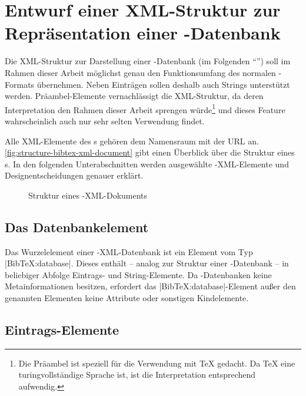 \section[Entwurf einer XML-Struktur]{Entwurf einer XML-Struktur zur Repräsentation einer \mbox{\BibTeX-}Datenbank}

\def\temp{
    Die Präambel ist speziell für die Verwendung mit \TeX{} gedacht. Da \TeX{}
    eine turingvollständige Sprache ist, ist die Interpretation entsprechend
    aufwendig.
}

Die XML-Struktur zur Darstellung einer \mbox{\BibTeX-}Datenbank (im Folgenden
\enquote{\BibTeXXML}) soll im Rahmen dieser Arbeit möglichst genau den
Funktionsumfang des normalen \mbox{\BibTeX-}Formats übernehmen. Neben Einträgen
sollen deshalb auch Strings unterstützt werden. Präambel-Elemente vernachlässigt
die XML-Struktur, da deren Interpretation den Rahmen dieser Arbeit sprengen
würde\footnote{\temp} und dieses Feature wahrscheinlich auch nur sehr selten
Verwendung findet.

Alle XML-Elemente des \BibTeXXMLformat s gehören dem Namensraum mit der URL
\BibTeXXMLnamespace an. \autoref{fig:structure-bibtex-xml-document} gibt einen
Überblick über die Struktur eines \BibTeXXMLdoc s. In den folgenden
Unterabschnitten werden ausgewählte \mbox{\BibTeX-}XML-Elemente und
Designentscheidungen genauer erklärt.

\begin{figure}
    \centering
    
    \caption{Struktur eines \mbox{\BibTeX-}XML-Dokuments}
    \label{fig:structure-bibtex-xml-document}
\end{figure}

\subsection{Das Datenbankelement}

Das Wurzelelement einer \mbox{\BibTeX}-XML-Datenbank ist ein Element vom Typ
\mbox{\lstinlineXML|BibTeX:database|.} Dieses enthält -- analog zur Struktur
einer \mbox{\BibTeX-}Datenbank -- in beliebiger Abfolge Eintrags- und
String-Elemente. Da \mbox{\BibTeX-}Datenbanken keine Metainformationen besitzen,
erfordert das \mbox{\lstinlineXML|BibTeX:database|-}Element außer den genannten
Elementen keine Attribute oder sonstigen Kindelemente.

\subsection{Eintrags-Elemente}

